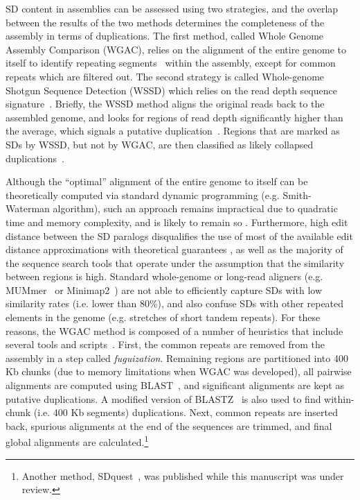 \documentclass{article}
\begin{document}
SD content in assemblies can be assessed using two strategies, and the overlap between the results of the two methods determines the completeness of the assembly in terms of duplications. The first method, called Whole Genome Assembly Comparison (WGAC), relies on the alignment of the entire genome to itself to identify repeating segments~\citep{Bailey2001} within the assembly, except for common repeats which are filtered out. The second strategy is called Whole-genome Shotgun Sequence Detection (WSSD) which relies on the read depth sequence signature~\citep{Bailey2002}. Briefly, the WSSD method aligns the original reads back to the assembled genome, and looks for regions of read depth significantly higher than the average, which signals a putative duplication~\citep{Bailey2002}. 
Regions that are marked as SDs by WSSD, but not by WGAC, are then classified as likely collapsed duplications~\citep{Alkan2011b}.


Although the ``optimal'' alignment of the entire genome to itself can be theoretically computed via standard dynamic programming  (e.g. Smith-Waterman algorithm), such an approach remains impractical due to quadratic time and memory complexity, and is likely to remain so \citep{Backurs2015}. Furthermore, high edit distance between the SD paralogs disqualifies the use of most of the available edit distance approximations with theoretical guarantees \citep{Andoni2010,Hanada2011}, as well as the majority of the sequence search tools that operate under the assumption that the similarity between regions is high. 
Standard whole-genome or long-read aligners (e.g. MUMmer~\citep{marccais2018mummer4} or Minimap2~\citep{Li2018}) are not able to efficiently capture SDs with low similarity rates (i.e. lower than 80\%), and also confuse SDs with other repeated elements in the genome (e.g. stretches of short tandem repeats).
For these reasons, the WGAC method is composed of a number of heuristics that include several tools and scripts~\citep{Bailey2001}. First, the common repeats are removed from the assembly in a step called \textit{fuguization}. Remaining regions are partitioned into 400 Kb chunks (due to memory limitations when WGAC was developed), all pairwise alignments are computed using BLAST~\citep{Altschul1990}, and significant alignments are kept as putative duplications.  A modified version of BLASTZ~\citep{Schwartz2003} is also used to find within-chunk (i.e. 400 Kb segments) duplications.
Next, common repeats are inserted back, spurious alignments at the end of the sequences are trimmed, and final global alignments are calculated.\footnote{Another method, SDquest~\citep{Pu2018}, was published while this manuscript was under review.}
\end{document}
